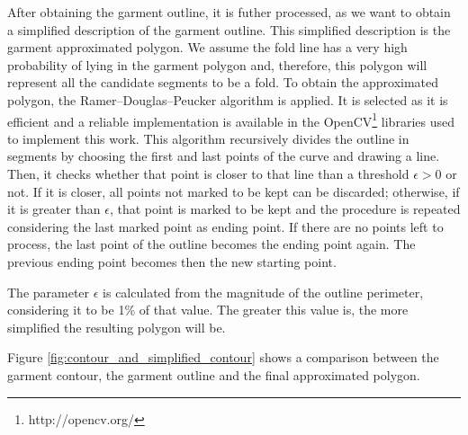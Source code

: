 After obtaining the garment outline, it is futher processed, as we want to obtain a simplified description of the garment outline. This simplified description is the garment approximated polygon. We assume the fold line has a very high probability of lying in the garment polygon and, therefore, this polygon will represent all the candidate segments to be a fold. To obtain the approximated polygon, the Ramer–Douglas–Peucker algorithm  is applied. It is selected as it is efficient and a reliable implementation is available in the OpenCV\footnote{http://opencv.org/} libraries used to implement this work. This algorithm recursively divides the outline in segments by choosing the first and last points of the curve and drawing a line. Then, it checks whether that point is closer to that line than a threshold $\epsilon > 0$ or not. If it is closer, all points not marked to be kept can be discarded; otherwise, if it is greater than $\epsilon$, that point is marked to be kept and the procedure is repeated considering the last marked point as ending point. If there are no points left to process, the last point of the outline becomes the ending point again. The previous ending point becomes then the new starting point.

The parameter $\epsilon$ is calculated from the magnitude of the outline perimeter, considering it to be 1\% of that value. The greater this value is, the more simplified the resulting polygon will be.

Figure \ref{fig:contour_and_simplified_contour} shows a comparison between the garment contour, the garment outline and the final approximated polygon.


